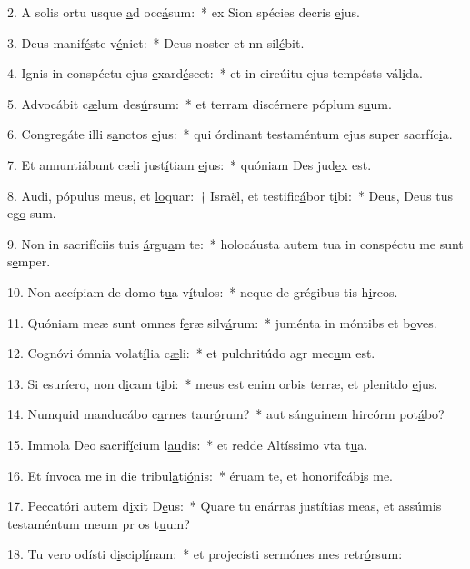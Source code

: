 2. A solis ortu usque \uline{a}d occ\uline{á}sum:~* ex Sion spécies decris \uline{e}jus.\par 
3. Deus manif\uline{é}ste v\uline{é}niet:~* Deus noster et nn sil\uline{é}bit.\par 
4. Ignis in conspéctu ejus \uline{e}xard\uline{é}scet:~* et in circúitu ejus tempésts vál\uline{i}da.\par 
5. Advocábit c\uline{æ}lum des\uline{ú}rsum:~* et terram discérnere póplum s\uline{u}um.\par 
6. Congregáte illi s\uline{a}nctos \uline{e}jus:~* qui órdinant testaméntum ejus super sacrfíc\uline{i}a.\par 
7. Et annuntiábunt cæli just\uline{í}tiam \uline{e}jus:~* quóniam Des jud\uline{e}x est.\par 
8. Audi, pópulus meus, et \uline{lo}quar:~† Israël, et testific\uline{á}bor t\uline{i}bi:~* Deus, Deus tus eg\uline{o} sum.\par 
9. Non in sacrifíciis tuis \uline{á}rgu\uline{a}m te:~* holocáusta autem tua in conspéctu me sunt s\uline{e}mper.\par 
10. Non accípiam de domo t\uline{u}a v\uline{í}tulos:~* neque de grégibus tis h\uline{i}rcos.\par 
11. Quóniam meæ sunt omnes f\uline{e}ræ silv\uline{á}rum:~* juménta in móntibs et b\uline{o}ves.\par 
12. Cognóvi ómnia volat\uline{í}lia c\uline{æ}li:~* et pulchritúdo agr mec\uline{u}m est.\par 
13. Si esuríero, non d\uline{i}cam t\uline{i}bi:~* meus est enim orbis terræ, et plenitdo \uline{e}jus.\par 
14. Numquid manducábo c\uline{a}rnes taur\uline{ó}rum?~* aut sánguinem hircórm pot\uline{á}bo?\par 
15. Immola Deo sacrif\uline{í}cium l\uline{au}dis:~* et redde Altíssimo vta t\uline{u}a.\par 
16. Et ínvoca me in die tribul\uline{a}ti\uline{ó}nis:~* éruam te, et honorifcáb\uline{i}s me.\par 
17. Peccatóri autem d\uline{i}xit D\uline{e}us:~* Quare tu enárras justítias meas, et assúmis testaméntum meum pr os t\uline{u}um?\par 
18. Tu vero odísti d\uline{i}scipl\uline{í}nam:~* et projecísti sermónes mes retr\uline{ó}rsum:\par 
